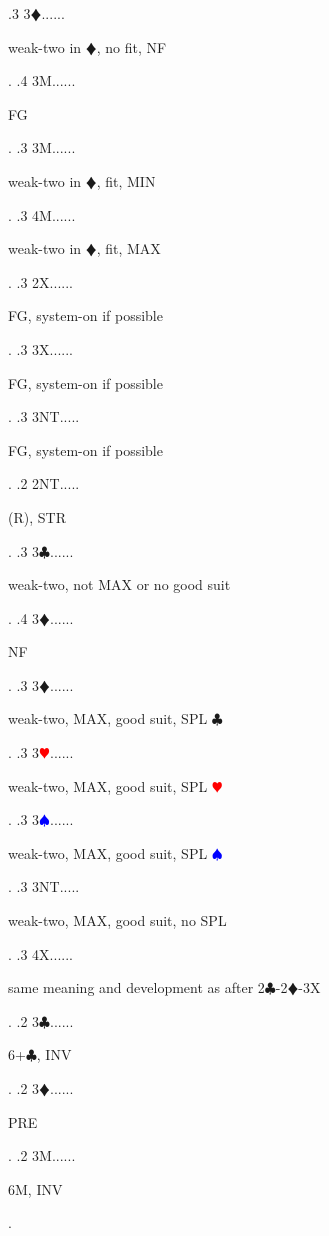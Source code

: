\documentclass[a4paper]{article}
\newcommand{\BC}{\textcolor{OliveGreen}{$\clubsuit$}}
\newcommand{\BD}{\textcolor{RedOrange}{$\vardiamondsuit$}}
\newcommand{\BH}{\textcolor{Red}{$\varheartsuit${}}}
\newcommand{\BS}{\textcolor{Blue}{$\spadesuit${}}}
\begin{document}
{ .3 3\BD......\begin{minipage}[t]{0.8\textwidth}
weak-two in \BD , no fit, NF
\end{minipage}. 
 .4 3M......\begin{minipage}[t]{0.8\textwidth}
FG
\end{minipage}. 
 .3 3M......\begin{minipage}[t]{0.8\textwidth}
weak-two in \BD , fit, MIN
\end{minipage}. 
 .3 4M......\begin{minipage}[t]{0.8\textwidth}
weak-two in \BD , fit, MAX
\end{minipage}. 
 .3 2X......\begin{minipage}[t]{0.8\textwidth}
FG, system-on if possible
\end{minipage}. 
 .3 3X......\begin{minipage}[t]{0.8\textwidth}
FG, system-on if possible
\end{minipage}. 
 .3 3NT.....\begin{minipage}[t]{0.8\textwidth}
FG, system-on if possible
\end{minipage}. 
 .2 2NT.....\begin{minipage}[t]{0.8\textwidth}
(R), STR
\end{minipage}. 
 .3 3\BC......\begin{minipage}[t]{0.8\textwidth}
weak-two, not MAX or no good suit
\end{minipage}. 
 .4 3\BD......\begin{minipage}[t]{0.8\textwidth}
NF
\end{minipage}. 
 .3 3\BD......\begin{minipage}[t]{0.8\textwidth}
weak-two, MAX, good suit, SPL \BC 
\end{minipage}. 
 .3 3\BH......\begin{minipage}[t]{0.8\textwidth}
weak-two, MAX, good suit, SPL \BH 
\end{minipage}. 
 .3 3\BS......\begin{minipage}[t]{0.8\textwidth}
weak-two, MAX, good suit, SPL \BS 
\end{minipage}. 
 .3 3NT.....\begin{minipage}[t]{0.8\textwidth}
weak-two, MAX, good suit, no SPL
\end{minipage}. 
 .3 4X......\begin{minipage}[t]{0.8\textwidth}
same meaning and development as after 2\BC -2\BD -3X
\end{minipage}. 
 .2 3\BC......\begin{minipage}[t]{0.8\textwidth}
6+\BC , INV
\end{minipage}. 
 .2 3\BD......\begin{minipage}[t]{0.8\textwidth}
PRE
\end{minipage}. 
 .2 3M......\begin{minipage}[t]{0.8\textwidth}
6M, INV
\end{minipage}. 
}
\bigbreak
\end{document}
